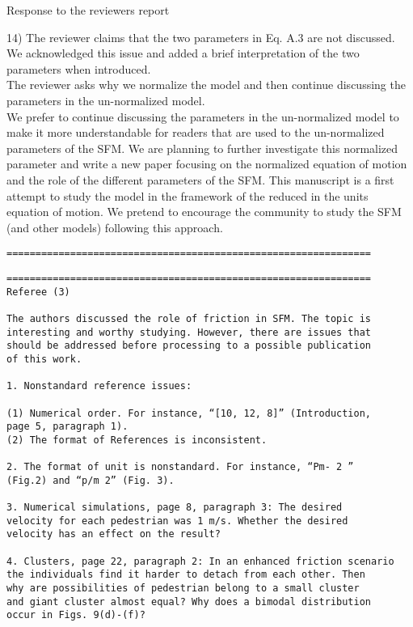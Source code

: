 \documentclass[a4paper,12pt]{letter}
\begin{document}
\begin{letter}{Response to the reviewers report}
{14) The reviewer claims that the two parameters in Eq. A.3 are not discussed.
We acknowledged this issue and added a brief interpretation of the two parameters when introduced.\\

The reviewer asks why we normalize the model and then continue discussing the parameters in the un-normalized model.\\

We prefer to continue discussing the parameters in the un-normalized model to make it more understandable for readers that are used to the un-normalized parameters of the SFM. We are planning to further investigate this normalized parameter and write a new paper focusing on the normalized equation of motion and the role of the different parameters of the SFM. This manuscript is a first attempt to study the model in the framework of the reduced in the units equation of motion. We pretend to encourage the community to study the SFM (and other models) following this approach.


\begin{verbatim}
===============================================================
\end{verbatim}

}

\newpage

\begin{verbatim}
===============================================================
Referee (3)

The authors discussed the role of friction in SFM. The topic is 
interesting and worthy studying. However, there are issues that 
should be addressed before processing to a possible publication 
of this work.

1. Nonstandard reference issues:

(1) Numerical order. For instance, “[10, 12, 8]” (Introduction,
page 5, paragraph 1).
(2) The format of References is inconsistent.

2. The format of unit is nonstandard. For instance, “Pm- 2 ” 
(Fig.2) and “p/m 2” (Fig. 3).

3. Numerical simulations, page 8, paragraph 3: The desired 
velocity for each pedestrian was 1 m/s. Whether the desired 
velocity has an effect on the result?

4. Clusters, page 22, paragraph 2: In an enhanced friction scenario 
the individuals find it harder to detach from each other. Then 
why are possibilities of pedestrian belong to a small cluster 
and giant cluster almost equal? Why does a bimodal distribution 
occur in Figs. 9(d)-(f)?


\end{verbatim}
\end{letter}
\end{document}

